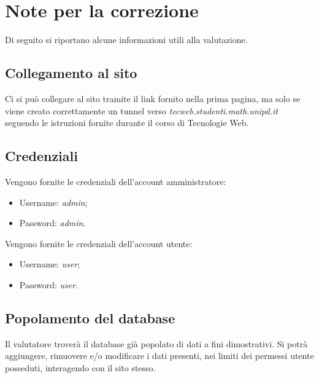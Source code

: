 \section{Note per la correzione}

Di seguito si riportano alcune informazioni utili alla valutazione.

\subsection{Collegamento al sito}
Ci si può collegare al sito tramite il link fornito nella prima pagina, ma solo se viene creato
correttamente un tunnel verso \textit{tecweb.studenti.math.unipd.it} seguendo le istruzioni fornite
durante il corso di Tecnologie Web.

\subsection{Credenziali}
Vengono fornite le credenziali dell'account amministratore:
\begin{itemize}
	\item Username: \textit{admin};
	\item Password: \textit{admin}.
\end{itemize}
Vengono fornite le credenziali dell'account utente:
\begin{itemize}
	\item Username: \textit{user};
	\item Password: \textit{user}.
\end{itemize}

\subsection{Popolamento del database}
Il valutatore troverà il database già popolato di dati a fini dimostrativi. Si potrà aggiungere,
rimuovere e/o modificare i dati presenti, nei limiti dei permessi utente posseduti, interagendo con il sito
stesso.
